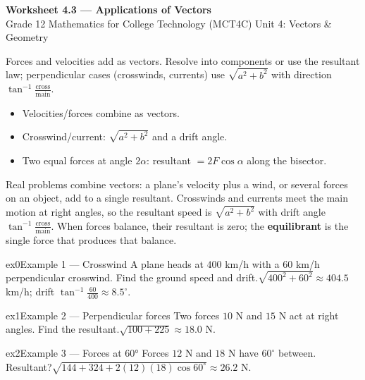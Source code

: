 \documentclass[11pt]{article}
\begin{document}
\begin{center}
{\LARGE\bfseries\color{titleblue}Worksheet 4.3 --- Applications of Vectors}\\[2pt]
{\small Grade 12 Mathematics for College Technology (MCT4C) \textperiodcentered{} Unit 4: Vectors \& Geometry}
\end{center}

\begin{ideabox}
Forces and velocities add as vectors. Resolve into components or use the resultant law; perpendicular cases (crosswinds, currents) use $\sqrt{a^2+b^2}$ with direction $\tan^{-1}\tfrac{\text{cross}}{\text{main}}$.
\begin{itemize}[leftmargin=*,itemsep=2pt]
  \item Velocities/forces combine as vectors.
  \item Crosswind/current: $\sqrt{a^2+b^2}$ and a drift angle.
  \item Two equal forces at angle $2\alpha$: resultant $=2F\cos\alpha$ along the bisector.
\end{itemize}
\end{ideabox}

\begin{learnbox}
Real problems combine vectors: a plane's velocity plus a wind, or several forces on an object, add to a single resultant.
Crosswinds and currents meet the main motion at right angles, so the resultant speed is $\sqrt{a^2+b^2}$ with drift angle $\tan^{-1}\tfrac{\text{cross}}{\text{main}}$.
When forces balance, their resultant is zero; the \textbf{equilibrant} is the single force that produces that balance.
\end{learnbox}


\begin{example}{ex0}{Example 1 --- Crosswind}
A plane heads at $400$ km/h with a $60$ km/h perpendicular crosswind. Find the ground speed and drift.\soln $\sqrt{400^2+60^2}\approx404.5$ km/h; drift $\tan^{-1}\tfrac{60}{400}\approx8.5^\circ$.
\end{example}

\begin{example}{ex1}{Example 2 --- Perpendicular forces}
Two forces $10$ N and $15$ N act at right angles. Find the resultant.\soln $\sqrt{100+225}\approx18.0$ N.
\end{example}

\begin{example}{ex2}{Example 3 --- Forces at 60°}
Forces $12$ N and $18$ N have $60^\circ$ between. Resultant?\soln $\sqrt{144+324+2(12)(18)\cos60^\circ}\approx26.2$ N.
\end{example}
\end{document}
